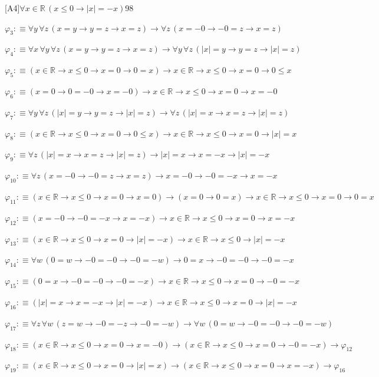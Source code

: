 \begin{fullproof}{[A4]}{$\forall x \in \mathbb{R}\,(x \leq 0 \to \lvert x \rvert = -x)$}{98}
\begin{abbrevlist}
\item $\varphi_{3} :\equiv \forall y\,\forall z\,(x = y \to y = z \to x = z) \to \forall z\,(x = -0 \to -0 = z \to x = z)$
\item $\varphi_{4} :\equiv \forall x\,\forall y\,\forall z\,(x = y \to y = z \to x = z) \to \forall y\,\forall z\,(\lvert x \rvert = y \to y = z \to \lvert x \rvert = z)$
\item $\varphi_{5} :\equiv (x \in \mathbb{R} \to x \leq 0 \to x = 0 \to 0 = x) \to x \in \mathbb{R} \to x \leq 0 \to x = 0 \to 0 \leq x$
\item $\varphi_{6} :\equiv (x = 0 \to 0 = -0 \to x = -0) \to x \in \mathbb{R} \to x \leq 0 \to x = 0 \to x = -0$
\item $\varphi_{7} :\equiv \forall y\,\forall z\,(\lvert x \rvert = y \to y = z \to \lvert x \rvert = z) \to \forall z\,(\lvert x \rvert = x \to x = z \to \lvert x \rvert = z)$
\item $\varphi_{8} :\equiv (x \in \mathbb{R} \to x \leq 0 \to x = 0 \to 0 \leq x) \to x \in \mathbb{R} \to x \leq 0 \to x = 0 \to \lvert x \rvert = x$
\item $\varphi_{9} :\equiv \forall z\,(\lvert x \rvert = x \to x = z \to \lvert x \rvert = z) \to \lvert x \rvert = x \to x = -x \to \lvert x \rvert = -x$
\item $\varphi_{10} :\equiv \forall z\,(x = -0 \to -0 = z \to x = z) \to x = -0 \to -0 = -x \to x = -x$
\item $\varphi_{11} :\equiv (x \in \mathbb{R} \to x \leq 0 \to x = 0 \to x = 0) \to (x = 0 \to 0 = x) \to x \in \mathbb{R} \to x \leq 0 \to x = 0 \to 0 = x$
\item $\varphi_{12} :\equiv (x = -0 \to -0 = -x \to x = -x) \to x \in \mathbb{R} \to x \leq 0 \to x = 0 \to x = -x$
\item $\varphi_{13} :\equiv (x \in \mathbb{R} \to x \leq 0 \to x = 0 \to \lvert x \rvert = -x) \to x \in \mathbb{R} \to x \leq 0 \to \lvert x \rvert = -x$
\item $\varphi_{14} :\equiv \forall w\,(0 = w \to -0 = -0 \to -0 = -w) \to 0 = x \to -0 = -0 \to -0 = -x$
\item $\varphi_{15} :\equiv (0 = x \to -0 = -0 \to -0 = -x) \to x \in \mathbb{R} \to x \leq 0 \to x = 0 \to -0 = -x$
\item $\varphi_{16} :\equiv (\lvert x \rvert = x \to x = -x \to \lvert x \rvert = -x) \to x \in \mathbb{R} \to x \leq 0 \to x = 0 \to \lvert x \rvert = -x$
\item $\varphi_{17} :\equiv \forall z\,\forall w\,(z = w \to -0 = -z \to -0 = -w) \to \forall w\,(0 = w \to -0 = -0 \to -0 = -w)$
\item $\varphi_{18} :\equiv (x \in \mathbb{R} \to x \leq 0 \to x = 0 \to x = -0) \to (x \in \mathbb{R} \to x \leq 0 \to x = 0 \to -0 = -x) \to \varphi_{12}$
\item $\varphi_{19} :\equiv (x \in \mathbb{R} \to x \leq 0 \to x = 0 \to \lvert x \rvert = x) \to (x \in \mathbb{R} \to x \leq 0 \to x = 0 \to x = -x) \to \varphi_{16}$
\end{abbrevlist}
\end{fullproof}

